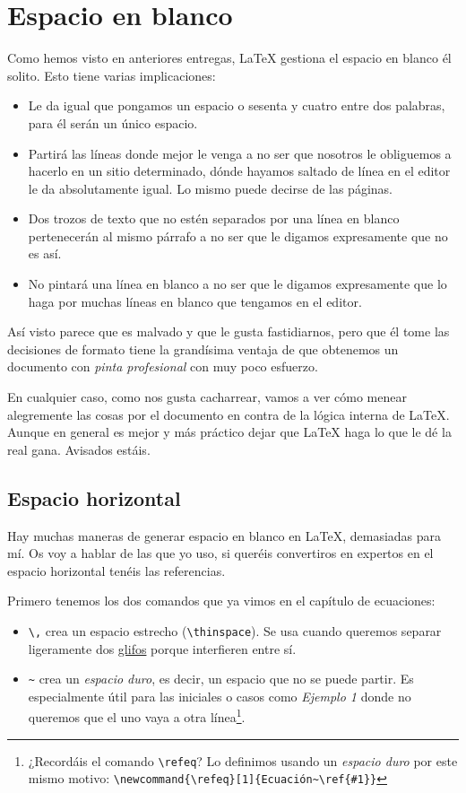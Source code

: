 \section{Espacio en blanco}\label{espacio-en-blanco}

Como hemos visto en anteriores entregas, LaTeX gestiona el espacio en
blanco él solito. Esto tiene varias implicaciones:

\begin{itemize}
\item
  Le da igual que pongamos un espacio o sesenta y cuatro entre dos
  palabras, para él serán un único espacio.
\item
  Partirá las líneas donde mejor le venga a no ser que nosotros le
  obliguemos a hacerlo en un sitio determinado, dónde hayamos saltado de
  línea en el editor le da absolutamente igual. Lo mismo puede decirse
  de las páginas.
\item
  Dos trozos de texto que no estén separados por una línea en blanco
  pertenecerán al mismo párrafo a no ser que le digamos expresamente que
  no es así.
\item
  No pintará una línea en blanco a no ser que le digamos expresamente
  que lo haga por muchas líneas en blanco que tengamos en el editor.
\end{itemize}

Así visto parece que es malvado y que le gusta fastidiarnos, pero que él
tome las decisiones de formato tiene la grandísima ventaja de que
obtenemos un documento con \emph{pinta profesional} con muy poco
esfuerzo.

En cualquier caso, como nos gusta cacharrear, vamos a ver cómo menear
alegremente las cosas por el documento en contra de la lógica interna de
LaTeX. Aunque en general es mejor y más práctico dejar que LaTeX haga lo
que le dé la real gana. Avisados estáis.

\subsection{Espacio horizontal}\label{espacio-horizontal}

Hay muchas maneras de generar espacio en blanco en LaTeX, demasiadas
para mí. Os voy a hablar de las que yo uso, si queréis convertiros en
expertos en el espacio horizontal tenéis las referencias.

Primero tenemos los dos comandos que ya vimos en el capítulo de
ecuaciones:

\begin{itemize}
\item
  \lstinline!\,! crea un espacio estrecho (\lstinline!\thinspace!). Se
  usa cuando queremos separar ligeramente dos
  \href{http://defharo.com/tipografia/glifos/}{glifos} porque
  interfieren entre sí.
\item
  \lstinline!~! crea un \emph{espacio duro}, es decir, un espacio que no
  se puede partir. Es especialmente útil para las iniciales o casos como
  \emph{Ejemplo 1} donde no queremos que el uno vaya a otra
  línea\footnote{¿Recordáis el comando \lstinline!\refeq!? Lo definimos
    usando un \emph{espacio duro} por este mismo motivo:
    \lstinline!\newcommand{\refeq}[1]{Ecuación~\ref{#1}}!}.
\end{itemize}

